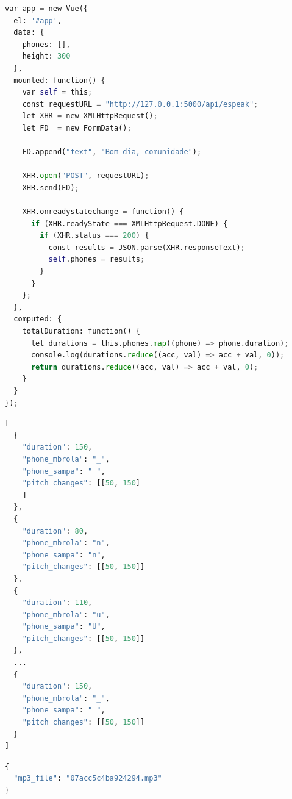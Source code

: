 \begin{lstlisting}[caption=Editor gráfico, label=editorjs, language=Python]
var app = new Vue({
  el: '#app',
  data: {
    phones: [],
    height: 300
  },
  mounted: function() {
    var self = this;
    const requestURL = "http://127.0.0.1:5000/api/espeak";
    let XHR = new XMLHttpRequest();
    let FD  = new FormData();

    FD.append("text", "Bom dia, comunidade");

    XHR.open("POST", requestURL);
    XHR.send(FD);

    XHR.onreadystatechange = function() {
      if (XHR.readyState === XMLHttpRequest.DONE) {
        if (XHR.status === 200) {
          const results = JSON.parse(XHR.responseText);
          self.phones = results;
        }
      }
    };
  },
  computed: {
    totalDuration: function() {
      let durations = this.phones.map((phone) => phone.duration);
      console.log(durations.reduce((acc, val) => acc + val, 0));
      return durations.reduce((acc, val) => acc + val, 0);
    }
  }
});
\end{lstlisting}

\begin{lstlisting}[caption=Exemplo de resposta para \emph{endpoint} do eSpeakNG, label=espeakpost, language=Python]
[
  {
    "duration": 150,
    "phone_mbrola": "_",
    "phone_sampa": " ",
    "pitch_changes": [[50, 150]
    ]
  },
  {
    "duration": 80,
    "phone_mbrola": "n",
    "phone_sampa": "n",
    "pitch_changes": [[50, 150]]
  },
  {
    "duration": 110,
    "phone_mbrola": "u",
    "phone_sampa": "U",
    "pitch_changes": [[50, 150]]
  },
  ...
  {
    "duration": 150,
    "phone_mbrola": "_",
    "phone_sampa": " ",
    "pitch_changes": [[50, 150]]
  }
]
\end{lstlisting}

\begin{lstlisting}[caption=Exemplo de resposta para \emph{endpoint} do MBROLA, label=mbrolaget, language=Python]
{
  "mp3_file": "07acc5c4ba924294.mp3"
}
\end{lstlisting}
